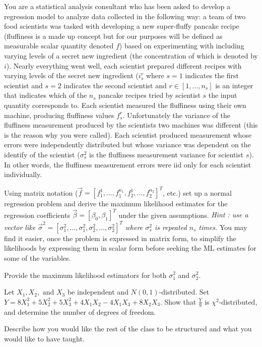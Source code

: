 \documentclass[12pt]{article}
\begin{document}
{
You are a statistical analysis consultant who has been asked to develop a regression model to analyze data collected in the following way:  a team of two food scientists was tasked with developing a new super-fluffy pancake recipe (fluffiness is a made up concept but for our purposes will be defined as measurable scalar quantity denoted $f$) based on experimenting with including varying levels of a secret new ingredient (the concentration of which is denoted by $i$).  Nearly everything went well, each scientist prepared different recipes with varying levels of the secret new ingredient ($i_s^r$ where $s=1$ indicates the first scientist and $s=2$ indicates the second scientist and $r \in [1, \ldots, n_s]$ is an integer that indicates which of the $n_s$ pancake recipes tried by scientist $s$ the input quantity corresponds to.   Each scientist measured the fluffiness using their own machine, producing fluffiness values $f_s^r$.  Unfortunately the variance of the fluffiness measurement produced by the scientists two machines was different (this is the reason why you were called).  Each scientist produced measurement whose errors were independently distributed but whose variance was dependent on the identify of the scientist ($\sigma^2_s$ is the fluffiness measurement variance for scientist $s$).   In other words, the fluffiness measurement errors were iid only for each scientist individually.

\abcs 
\item Using matrix notation ($\vec f = [f_1^1,\ldots,f_1^{n_1}, f_2^1,\ldots,f_2^{n_2}]^T$, etc.) set up a normal regression problem and derive the maximum likelihood estimates for the regression coefficients $\vec \beta = [\beta_0, \beta_1]^T$ under the given assumptions.  {\em Hint : use a vector like $\vec{\sigma}^2 = [\sigma^2_1,\ldots,\sigma^2_1, \sigma^2_2,\ldots,\sigma^2_2]^T$ where $\sigma^2_s$ is repeated $n_s$ times.}  You may find it easier, once the problem is expressed in matrix form, to simplify the likelihoods by expressing them in scalar form before seeking the ML estimates for some of the variables.
\item Provide the maximum likelihood estimators for both $\sigma^2_1$ and $\sigma^2_2.$
\endabcs
}
{
\vfill
\newpage
}
{
}


{
Let  $X_1, X_2, \mbox{ and } X_3$  be independent and $N(0,1)$-distributed.  Set $Y=8X_1^2 + 5 X_2^2 + 5X_3^2 + 4 X_1X_2 -4 X_1X_3 + 8X_2X_3$.  Show that $\frac{Y}{9}$ is $\chi^2$-distributed, and determine the number of degrees of freedom. }
{
\vfill
\newpage
}
{
}


 {
Describe how you would like the rest of the class to be structured and what you would like to have taught.  
}
 { \vfill
  \answer
} {  }


\problemsdone
\end{document}
